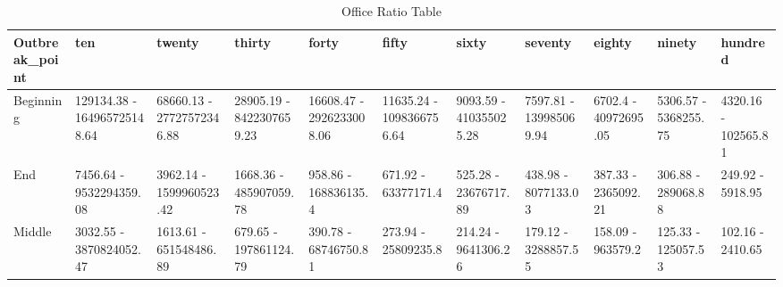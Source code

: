 \begin{table}

\caption{Office Ratio Table}
\centering
\begin{tabular}[t]{lllllllllll}
\toprule
Outbreak\_point & ten & twenty & thirty & forty & fifty & sixty & seventy & eighty & ninety & hundred\\
\midrule
Beginning & 129134.38 - 164965725148.64 & 68660.13 - 27727572346.88 & 28905.19 - 8422307659.23 & 16608.47 - 2926233008.06 & 11635.24 - 1098366756.64 & 9093.59 - 410355025.28 & 7597.81 - 139985069.94 & 6702.4 - 40972695.05 & 5306.57 - 5368255.75 & 4320.16 - 102565.81\\
End & 7456.64 - 9532294359.08 & 3962.14 - 1599960523.42 & 1668.36 - 485907059.78 & 958.86 - 168836135.4 & 671.92 - 63377171.4 & 525.28 - 23676717.89 & 438.98 - 8077133.03 & 387.33 - 2365092.21 & 306.88 - 289068.88 & 249.92 - 5918.95\\
Middle & 3032.55 - 3870824052.47 & 1613.61 - 651548486.89 & 679.65 - 197861124.79 & 390.78 - 68746750.81 & 273.94 - 25809235.8 & 214.24 - 9641306.26 & 179.12 - 3288857.55 & 158.09 - 963579.2 & 125.33 - 125057.53 & 102.16 - 2410.65\\
\bottomrule
\end{tabular}
\end{table}
